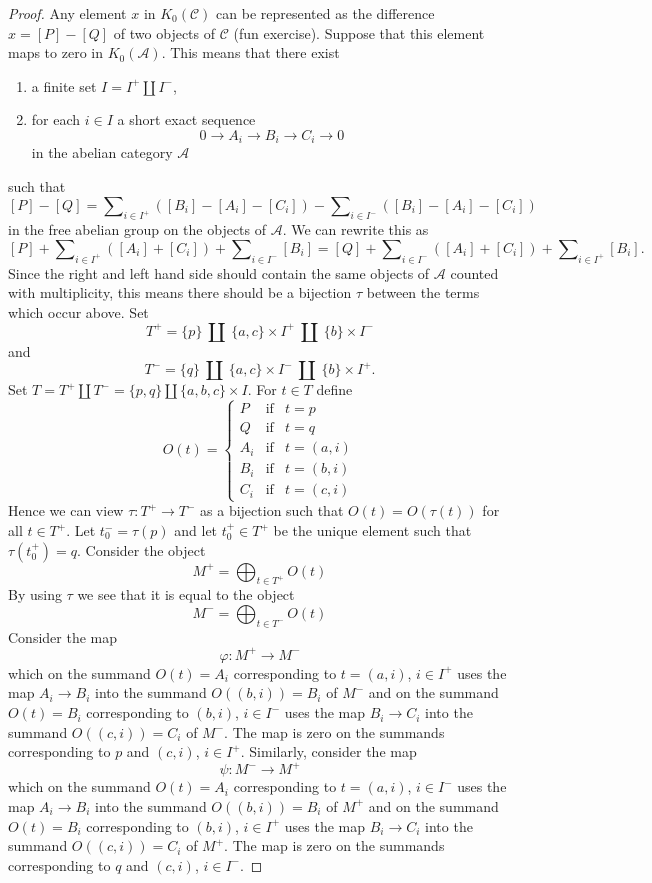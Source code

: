 \begin{proof}
\medskip\noindent
Any element $x$ in $K_0(\mathcal{C})$ can be represented as the
difference $x = [P] - [Q]$ of two objects of $\mathcal{C}$ (fun exercise).
Suppose that this element maps to zero in $K_0(\mathcal{A})$.
This means that there exist
\begin{enumerate}
\item a finite set $I = I^{+} \coprod I^{-}$,
\item for each $i \in I$ a short exact sequence
$$
0 \to A_i \to B_i \to C_i \to 0
$$
in the abelian category $\mathcal{A}$
\end{enumerate}
such that
$$
[P] - [Q] =
\sum\nolimits_{i \in I^{+}} ([B_i] - [A_i] - [C_i])
-
\sum\nolimits_{i \in I^{-}} ([B_i] - [A_i] - [C_i])
$$
in the free abelian group on the objects of $\mathcal{A}$.
We can rewrite this as
$$
[P]
+ \sum\nolimits_{i \in I^{+}} ([A_i] + [C_i])
+ \sum\nolimits_{i \in I^{-}} [B_i]
=
[Q]
+ \sum\nolimits_{i \in I^{-}} ([A_i] + [C_i])
+ \sum\nolimits_{i \in I^{+}} [B_i].
$$
Since the right and left hand side should contain the same objects
of $\mathcal{A}$ counted with multiplicity, this means there should be
a bijection $\tau$ between the terms which occur above. Set
$$
T^{+} =
\{p\}\ \coprod\ \{a, c\} \times I^{+}\ \coprod\ \{b\} \times I^{-}
$$
and
$$
T^{-} =
\{q\}\ \coprod\ \{a, c\} \times I^{-}\ \coprod\ \{b\} \times I^{+}.
$$
Set $T = T^{+} \coprod T^{-} = \{p, q\} \coprod \{a, b, c\} \times I$.
For $t \in T$ define
$$
O(t)
=
\left\{
\begin{matrix}
P & \text{if} & t = p \\
Q & \text{if} & t = q \\
A_i & \text{if} & t = (a, i) \\
B_i & \text{if} & t = (b, i) \\
C_i & \text{if} & t = (c, i)
\end{matrix}
\right.
$$
Hence we can view $\tau : T^{+} \to T^{-}$ as a bijection
such that $O(t) = O(\tau(t))$ for all $t \in T^{+}$.
Let $t^{-}_0 = \tau(p)$ and let $t^{+}_0 \in T^{+}$ be the
unique element such that $\tau(t^{+}_0) = q$.
Consider the object
$$
M^{+} = \bigoplus\nolimits_{t \in T^{+}} O(t)
$$
By using $\tau$ we see that it is equal to the object
$$
M^{-} = \bigoplus\nolimits_{t \in T^{-}} O(t)
$$
Consider the map
$$
\varphi : M^{+} \longrightarrow M^{-}
$$
which on the summand $O(t) = A_i$ corresponding to $t = (a, i)$, $i \in I^{+}$
uses the map $A_i \to B_i$ into the summand $O((b, i)) = B_i$ of $M^{-}$
and on the summand $O(t) = B_i$ corresponding to $(b, i)$, $i \in I^{-}$
uses the map $B_i \to C_i$ into the summand $O((c, i)) = C_i$ of $M^{-}$.
The map is zero on the summands corresponding to $p$
and $(c, i)$, $i \in I^{+}$.
Similarly, consider the map
$$
\psi : M^{-} \longrightarrow M^{+}
$$
which on the summand $O(t) = A_i$ corresponding to $t = (a, i)$, $i \in I^{-}$
uses the map $A_i \to B_i$ into the summand $O((b, i)) = B_i$ of $M^{+}$
and on the summand $O(t) = B_i$ corresponding to $(b, i)$, $i \in I^{+}$
uses the map $B_i \to C_i$ into the summand $O((c, i)) = C_i$ of $M^{+}$.
The map is zero on the summands corresponding to $q$ and
$(c, i)$, $i \in I^{-}$.


\end{proof}
